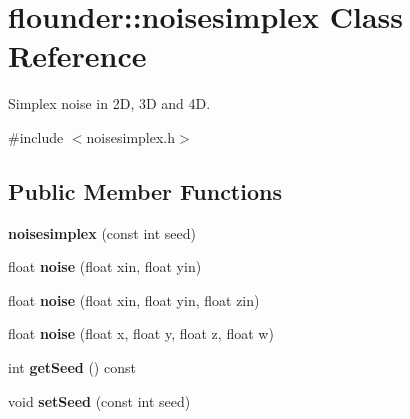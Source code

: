 \hypertarget{classflounder_1_1noisesimplex}{}\section{flounder\+:\+:noisesimplex Class Reference}
\label{classflounder_1_1noisesimplex}


Simplex noise in 2D, 3D and 4D.  




{\ttfamily \#include $<$noisesimplex.\+h$>$}

\subsection*{Public Member Functions}
\begin{DoxyCompactItemize}
\item 
\mbox{\label{classflounder_1_1noisesimplex_a22e17d813fd70497f294344c1834239b}} 
{\bfseries noisesimplex} (const int seed)
\item 
\mbox{\label{classflounder_1_1noisesimplex_aa238d0f0df567cfaa4a32b9cbe433f06}} 
float {\bfseries noise} (float xin, float yin)
\item 
\mbox{\label{classflounder_1_1noisesimplex_a7c076b9c7f98e30c4b0685bd2782c345}} 
float {\bfseries noise} (float xin, float yin, float zin)
\item 
\mbox{\label{classflounder_1_1noisesimplex_a17a8de3a1025193bb185835802098469}} 
float {\bfseries noise} (float x, float y, float z, float w)
\item 
\mbox{\label{classflounder_1_1noisesimplex_a743da606925dab4a7f2292038703441f}} 
int {\bfseries get\+Seed} () const
\item 
\mbox{\label{classflounder_1_1noisesimplex_a01e295347a6d11070383f0d4a393f489}} 
void {\bfseries set\+Seed} (const int seed)
\end{DoxyCompactItemize}
